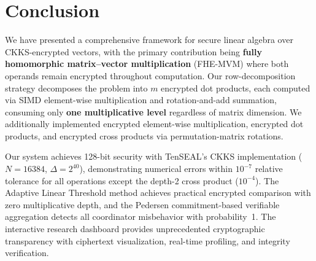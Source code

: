 \section{Conclusion}
\label{sec:conclusion}

We have presented a comprehensive framework for secure linear algebra over CKKS-encrypted vectors, with the primary contribution being \textbf{fully homomorphic matrix--vector multiplication} (FHE-MVM) where both operands remain encrypted throughout computation. Our row-decomposition strategy decomposes the problem into $m$ encrypted dot products, each computed via SIMD element-wise multiplication and rotation-and-add summation, consuming only \textbf{one multiplicative level} regardless of matrix dimension. We additionally implemented encrypted element-wise multiplication, encrypted dot products, and encrypted cross products via permutation-matrix rotations.

Our system achieves 128-bit security with TenSEAL's CKKS implementation ($N=16384$, $\Delta=2^{40}$), demonstrating numerical errors within $10^{-7}$ relative tolerance for all operations except the depth-2 cross product ($10^{-4}$). The Adaptive Linear Threshold method achieves practical encrypted comparison with zero multiplicative depth, and the Pedersen commitment-based verifiable aggregation detects all coordinator misbehavior with probability~1. The interactive research dashboard provides unprecedented cryptographic transparency with ciphertext visualization, real-time profiling, and integrity verification.

